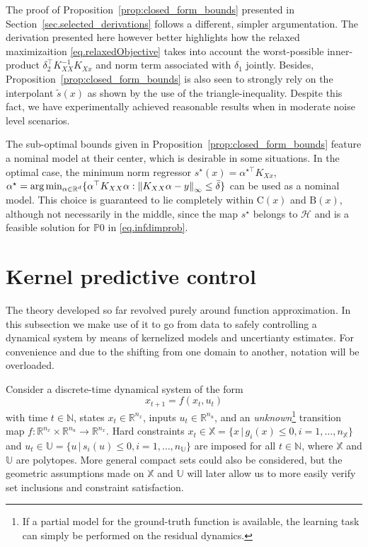 The proof of Proposition~\ref{prop:closed_form_bounds} presented in Section~\ref{sec.selected_derivations} follows a different, simpler argumentation. The derivation presented here however better highlights how the relaxed maximizaition \eqref{eq.relaxedObjective} takes into account the worst-possible inner-product $\delta_2^\top K_{XX}^{-1}K_{Xx}$ and norm term associated with $\delta_1$ jointly. Besides, Proposition~\ref{prop:closed_form_bounds} is also seen to strongly rely on the interpolant $\tilde s(x)$ as shown by the use of the triangle-inequality.  Despite this fact, we have experimentally achieved reasonable results when in moderate noise level scenarios.

\begin{remark}
	The sub-optimal bounds given in Proposition~\ref{prop:closed_form_bounds} feature a nominal model at their center, which is desirable in some situations. In the optimal case, the minimum norm regressor $s^\star(x) = \alpha^{\star\top} K_{Xx}$, $\alpha^\star = \text{arg}\min_{\alpha \in \mathbb{R}^d} \{ \alpha^\top K_{XX} \alpha : \left\| K_{XX} \alpha - y \right\|_\infty \leq \bar\delta \}$ can be used as a nominal model. This choice is guaranteed to lie completely within $\text{C}(x)$ and $\text{B}(x)$, although not necessarily in the middle, since the map $s^\star$ belongs to $\mathcal{H}$ and is a feasible solution for $\mathds{P}0$ in \eqref{eq.infdimprob}.
\end{remark}

\section{Kernel predictive control}
\label{sec.kpc}

The theory developed so far revolved purely around function approximation. In this subsection we make use of it to go from data to safely controlling a dynamical system by means of kernelized models and uncertianty estimates. For convenience and due to the shifting from one domain to another, notation will be overloaded.

Consider a discrete-time dynamical system of the form 
\begin{equation}
	\label{eq.dyn_sys}
	x_{t+1} = f(x_t,u_t)	
\end{equation}
with time $t \in \mathbb{N}$, states $x_t \in \mathbb{R}^{n_x}$, inputs $u_t \in \mathbb{R}^{n_u}$, and an \textit{unknown}\footnote{If a partial model for the ground-truth function is available, the learning task can simply be performed on the residual dynamics.} transition map $f: \mathbb{R}^{n_x} \times \mathbb{R}^{n_u} \rightarrow \mathbb{R}^{n_x}$. Hard constraints $x_t \in \mathbb{X} = \{x \, | \, g_i(x) \leq 0, i=1,\dots,n_{\mathbb{X}}\}$ and $u_t \in \mathbb{U} = \{u \, | \, s_i(u) \leq 0, i=1,\dots,n_{\mathbb{U}}\}$ are imposed for all $t \in \mathbb{N}$, where $\mathbb{X}$ and $\mathbb{U}$ are polytopes. More general compact sets could also be considered, but the geometric assumptions made on $\mathbb{X}$ and $\mathbb{U}$ will later allow us to more easily verify set inclusions and constraint satisfaction.

